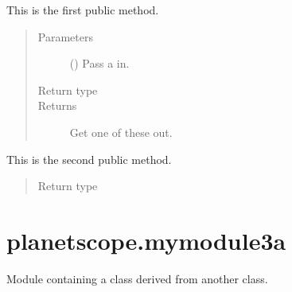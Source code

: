 \documentclass[letterpaper,10pt,english]{sphinxmanual}
\begin{document}
\begin{fulllineitems}
\begin{fulllineitems}
\label{\detokenize{_autosummary/planetscope.mymodule2.myClass2:planetscope.mymodule2.myClass2.myMethod1}}
\sphinxAtStartPar
This is the first public method.
\begin{quote}\begin{description}
\item[{Parameters}] \leavevmode
\sphinxAtStartPar
{} () \textendash{} Pass a  in.

\item[{Return type}] \leavevmode
\sphinxAtStartPar
{}

\item[{Returns}] \leavevmode
\sphinxAtStartPar
Get one of these out.

\end{description}\end{quote}

\end{fulllineitems}


\begin{fulllineitems}
\label{\detokenize{_autosummary/planetscope.mymodule2.myClass2:planetscope.mymodule2.myClass2.myMethod2}}
\sphinxAtStartPar
This is the second public method.
\begin{quote}\begin{description}
\item[{Return type}] \leavevmode
\sphinxAtStartPar
{}

\end{description}\end{quote}

\end{fulllineitems}


\end{fulllineitems}



\section{planetscope.mymodule3a}
\label{\detokenize{_autosummary/planetscope.mymodule3a:module-planetscope.mymodule3a}}\label{\detokenize{_autosummary/planetscope.mymodule3a:planetscope-mymodule3a}}\label{\detokenize{_autosummary/planetscope.mymodule3a::doc}}
\sphinxAtStartPar
Module containing a class derived from another class.
\end{document}

